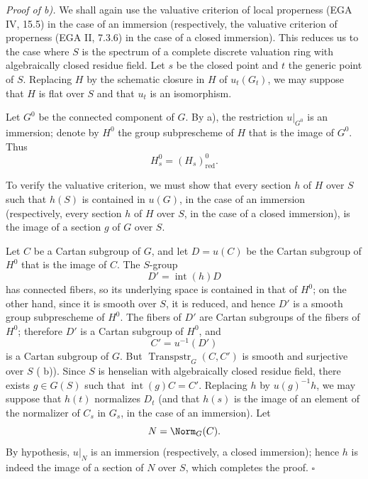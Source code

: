 \medskip
\noindent\textit{Proof of  b).}
We shall again use the valuative criterion of local properness
(EGA IV, 15.5) in the case of an immersion (respectively, the
valuative criterion of properness (EGA II, 7.3.6) in the case of a
closed immersion). This reduces us to the case where \(S\) is the
spectrum of a complete discrete valuation ring with algebraically
closed residue field. Let \(s\) be the closed point and \(t\) the
generic point of \(S\). Replacing \(H\) by the schematic closure in
\(H\) of \(u_t(G_t)\), we may suppose that \(H\) is flat over \(S\)
and that \(u_t\) is an isomorphism.

Let \(G^0\) be the connected component of \(G\). By  a), the
restriction \(u|_{G^0}\) is an immersion; denote by \(H^0\) the group
subprescheme of \(H\) that is the image of \(G^0\). Thus
\[
  H_s^0=(H_s)_{\mathrm{red}}^0.
\]

To verify the valuative criterion, we must show that every section
\(h\) of \(H\) over \(S\) such that \(h(S)\) is contained in
\(u(G)\), in the case of an immersion (respectively, every section
\(h\) of \(H\) over \(S\), in the case of a closed immersion), is
the image of a section \(g\) of \(G\) over \(S\).

Let \(C\) be a Cartan subgroup of \(G\), and let
\(D=u(C)\) be the Cartan subgroup of \(H^0\) that is the image of
\(C\). The \(S\)-group
\[
  D'=\operatorname{int}(h)D
\]
has connected fibers, so its underlying space is contained in that
of \(H^0\); on the other hand, since it is smooth over \(S\), it is
reduced, and hence \(D'\) is a smooth group subprescheme of \(H^0\).
The fibers of \(D'\) are Cartan subgroups of the fibers of \(H^0\);
therefore \(D'\) is a Cartan subgroup of \(H^0\), and
\[
  C'=u^{-1}(D')
\]
is a Cartan subgroup of \(G\). But
\(\operatorname{Transpstr}_G(C,C')\) is smooth and surjective over
\(S\) ( b)). Since \(S\) is henselian with
algebraically closed residue field, there exists \(g\in G(S)\) such
that \(\operatorname{int}(g)C=C'\). Replacing \(h\) by
\(u(g)^{-1}h\), we may suppose that \(h(t)\) normalizes \(D_t\)
(and that \(h(s)\) is the image of an element of the normalizer of
\(C_s\) in \(G_s\), in the case of an immersion). Let
\[
  N=\Norm_G(C).
\]
By hypothesis, \(u|_N\) is an immersion (respectively, a closed
immersion); hence \(h\) is indeed the image of a section of \(N\)
over \(S\), which completes the proof.
\hfill\(\square\)

